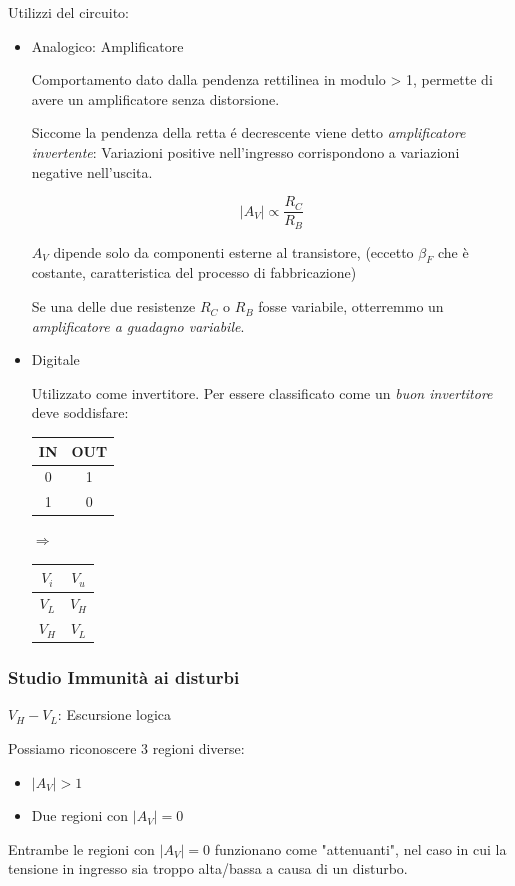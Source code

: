 \documentclass{article}
\begin{document}
Utilizzi del circuito:
\begin{itemize}
    \item Analogico: Amplificatore

        Comportamento dato dalla pendenza rettilinea in modulo > 1, permette di avere un amplificatore senza distorsione.

        Siccome la pendenza della retta \'e decrescente viene detto  \textit{amplificatore invertente}: Variazioni positive nell'ingresso corrispondono a variazioni negative nell'uscita.

        \[ |A_V | \propto \frac{R_C}{R_B} \]

        $A_V$ dipende solo da componenti esterne al transistore, (eccetto $\beta_F$ che è costante, caratteristica del processo di fabbricazione)

        Se una delle due resistenze $R_C$ o $R_B$ fosse variabile, otterremmo un \textit{amplificatore a guadagno variabile}.
    \item Digitale

        Utilizzato come invertitore. Per essere classificato come un \textit{buon invertitore} deve soddisfare:

        \begin{center}
            \begin{tabular}{c|c}
                IN & OUT \\
                \hline
                0 & 1\\
                1 & 0
            \end{tabular} $\Rightarrow$
            \begin{tabular}{c|c}
                $V_i$ & $V_u$ \\
                \hline
                $V_L$ & $V_H$\\
                $V_H$ & $V_L$
            \end{tabular}
        \end{center}
\end{itemize}


\subsubsection*{Studio Immunità ai disturbi}
$V_H - V_L$: Escursione logica

Possiamo riconoscere 3 regioni diverse:
\begin{itemize}
    \item $|A_V| > 1$
    \item Due regioni con $|A_V| = 0$
\end{itemize}
Entrambe le regioni con $|A_V| = 0$ funzionano come "attenuanti", nel caso in cui la tensione in ingresso sia troppo alta/bassa a causa di un disturbo.
\end{document}
